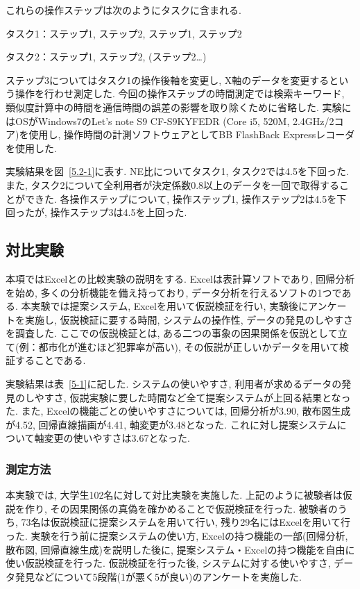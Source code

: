 \documentclass[sotsuron]{kuee}
\begin{document}
これらの操作ステップは次のようにタスクに含まれる.

タスク1：ステップ1, ステップ2, ステップ1, ステップ2

タスク2：ステップ1, ステップ2, (ステップ2…)

ステップ3についてはタスク1の操作後軸を変更し, X軸のデータを変更するという操作を行わせ測定した.
今回の操作ステップの時間測定では検索キーワード, 類似度計算中の時間を通信時間の誤差の影響を取り除くために省略した.
実験にはOSがWindows7のLet's note S9 CF-S9KYFEDR (Core i5, 520M, 2.4GHz/2コア)を使用し, 操作時間の計測ソフトウェアとしてBB FlashBack Expressレコーダを使用した.

実験結果を図~\ref{5.2-1}に表す. NE比についてタスク1, タスク2では4.5を下回った.
また, タスク2について全利用者が決定係数0.8以上のデータを一回で取得することができた.
各操作ステップについて, 操作ステップ1, 操作ステップ2は4.5を下回ったが, 操作ステップ3は4.5を上回った.


\subsection{対比実験}

本項ではExcelとの比較実験の説明をする. Excelは表計算ソフトであり, 回帰分析を始め, 多くの分析機能を備え持っており, データ分析を行えるソフトの1つである.
本実験では提案システム, Excelを用いて仮説検証を行い, 実験後にアンケートを実施し, 仮説検証に要する時間, システムの操作性, データの発見のしやすさを調査した.
ここでの仮説検証とは, ある二つの事象の因果関係を仮説として立て(例：都市化が進むほど犯罪率が高い), その仮説が正しいかデータを用いて検証することである.

実験結果は表~\ref{5-1}に記した. システムの使いやすさ, 利用者が求めるデータの発見のしやすさ, 仮説実験に要した時間など全て提案システムが上回る結果となった.
また, Excelの機能ごとの使いやすさについては, 回帰分析が3.90, 散布図生成が4.52, 回帰直線描画が4.41, 軸変更が3.48となった.
これに対し提案システムについて軸変更の使いやすさは3.67となった.

\subsubsection{測定方法}

本実験では, 大学生102名に対して対比実験を実施した. 上記のように被験者は仮説を作り, その因果関係の真偽を確かめることで仮説検証を行った.
被験者のうち, 73名は仮説検証に提案システムを用いて行い, 残り29名にはExcelを用いて行った.
実験を行う前に提案システムの使い方, Excelの持つ機能の一部(回帰分析, 散布図, 回帰直線生成)を説明した後に, 提案システム・Excelの持つ機能を自由に使い仮説検証を行った.
仮説検証を行った後, システムに対する使いやすさ, データ発見などについて5段階(1が悪く5が良い)のアンケートを実施した.
\end{document}
